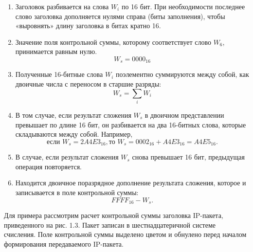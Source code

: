 \begin{enumerate}
	\item Заголовок разбивается на слова \begin{math} W_i \end{math}
	по 16 бит. При необходимости последнее слово заголовка дополняется нулями справа (биты заполнения), чтобы «выровнять» длину заголовка в битах кратно 16.
	\item Значение поля контрольной суммы, которому соответствует слово
	\begin{math} W_6 \end{math}, принимается равным нулю.
	\begin{displaymath} 
	W_s = 0000_\text{16}
	\end{displaymath}
	\item Полученные 16-битные слова \begin{math} W_i \end{math} поэлементно суммируются между собой, как двоичные числа с переносом в старшие разряды:
	\begin{displaymath} 
	W_s = \sum_{i} W_i
	\end{displaymath}
	\item В том случае, если результат сложения \begin{math} W_s \end{math} в двоичном представлении превышает по длине 16 бит, он разбивается на два 16-битных слова, которые складываются между собой. Например,
	\begin{displaymath} 
	\text{если } W_s = 2A4E3_\text{16}, \text{то } W_s  = 0002_\text{16} + A4E3_\text{16} = A4E5_\text{16}.
	\end{displaymath}
	\item В случае, если результат сложения \begin{math} W_s \end{math} снова превышает 16 бит, предыдущая операция повторяется.
	\item Находится двоичное поразрядное дополнение результата сложения, которое и записывается в поле контрольной суммы:
	\begin{displaymath} FFFF_\text{16} - W_s. \end{displaymath}
\end{enumerate}

Для примера рассмотрим расчет контрольной суммы заголовка IP-пакета, приведенного на рис. 1.3. Пакет записан в шестнадцатеричной системе счисления. Поле контрольной суммы выделено цветом и обнулено перед началом формирования передаваемого IP-пакета.

